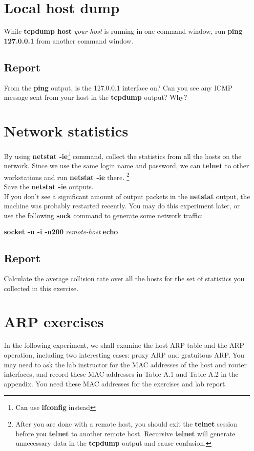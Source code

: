\documentclass{../UTNetLab}
\begin{document}
\section{Local host dump}
    While \textbf{tcpdump host} \textit{your-host} is running in one command window, run \textbf{ping 127.0.0.1} from another command window.
    \subsection*{Report}
    From the \textbf{ping} output, is the 127.0.0.1 interface on?
    Can you see any ICMP message sent from your host in the \textbf{tcpdump} output?
    Why?


\section{Network statistics}
    By using \textbf{netstat -ie}\footnote{Can use \textbf{ifconfig} instead} command, collect the statistics from all the hosts on the network.
    Since we use the same login name and password, we can \textbf{telnet} to other workstations and run \textbf{netstat -ie} there. \footnote{After you are done with a remote host, you should exit the \textbf{telnet} session before you \textbf{telnet} to another remote host.
    Recursive \textbf{telnet} will generate unnecessary data in the \textbf{tcpdump} output and cause confusion.} \\
    Save the \textbf{netstat -ie} outputs. \\
    If you don’t see a significant amount of output packets in the \textbf{netstat} output, the machine was probably restarted recently. You may do this experiment later, or use the following \textbf{sock} command to generate some network traffic: \\
    \centerline{\textbf{socket -u -i -n200} \textit{remote-host} \textbf{echo}}
    \subsection*{Report}
    Calculate the average collision rate over all the hosts for the set of statistics you collected in this exercise.

\section*{ARP exercises}
    In the following experiment, we shall examine the host ARP table and the ARP operation, including two interesting cases: proxy ARP and gratuitous ARP. You may need to ask the lab instructor for the MAC addresses of the host and router interfaces, and record these MAC addresses in Table A.1 and Table A.2 in the appendix.
    You need these MAC addresses for the exercises and lab report.
\end{document}
